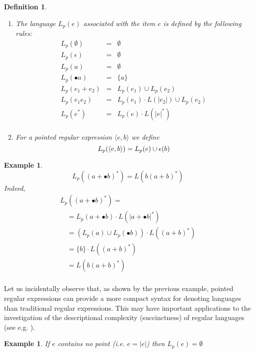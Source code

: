 \documentclass[preprint]{sigplanconf}
\newcommand{\Le}[1]{L(#1)}
\newcommand{\Lp}[1]{L_p(#1)}
\newcounter{item}
\newtheorem{definition}[item]{Definition}
\newtheorem{example}[item]{Example}
\begin{document}
\begin{definition}\ \label{def:Lp}
\begin{enumerate}
\item The language $\Lp e$ associated with the item $e$ is defined by the
following rules:
\[
\begin{array}{rcl}
\Lp \emptyset &=& \emptyset\\
\Lp \epsilon &=& \emptyset\\
\Lp a &=& \emptyset\\
\Lp{\bullet a} &=& \{a\}\\
\Lp{e_1 + e_2} &=& \Lp{e_1} \cup \Lp{e_2}\\
\Lp{e_1e_2} &=& \Lp{e_1} \cdot \Le{|e_2|} \cup \Lp{e_2} \\ 
\Lp{e^*} &=& \Lp{e} \cdot \Le{|e|^*}  \\ 
\end{array}
\]
\item For a pointed regular expression $\langle e,b \rangle$ we define
\[
\Lp{\langle e,b \rangle} = \Lp e \cup \epsilon(b)\\
\]
\end{enumerate}
\end{definition}

\begin{example}
\label{ex:compact}
\[\Lp{(a+\bullet b)^*} = \Le{b(a+b)^*} \]
Indeed,
\[
\begin{array}{l}
\Lp{(a+\bullet b)^*} = \\
\quad = \Lp{a+\bullet b} \cdot \Le{|a+\bullet b|^*} \\
\quad = (\Lp{a} \cup \Lp{\bullet b}) \cdot \Le{(a+b)^*}\\
\quad = \{b\} \cdot \Le{(a+b)^*}\\
\quad = \Le{b(a+b)^*}\\
\end{array}
\]
\end{example}
Let us incidentally observe that, as shown by the previous
example, pointed regular expressions can provide a more compact 
syntax for denoting languages than traditional regular expressions. 
This may have important applications to 
the investigation
of the descriptional complexity (succinctness) of regular languages
(see e.g. \cite{Gelade10, GruberH08, HolzerK09}). 




\begin{example}
If $e$ contains no point (i.e. $e = |e|$) then $\Lp e = \emptyset$
\end{example}
\end{document}
